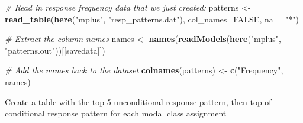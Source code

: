 \documentclass[
]{book}
\newenvironment{Shaded}{\begin{snugshade}}{\end{snugshade}}
\newcommand{\AttributeTok}[1]{\textcolor[rgb]{0.13,0.29,0.53}{#1}}
\newcommand{\CommentTok}[1]{\textcolor[rgb]{0.56,0.35,0.01}{\textit{#1}}}
\newcommand{\ConstantTok}[1]{\textcolor[rgb]{0.56,0.35,0.01}{#1}}
\newcommand{\FunctionTok}[1]{\textcolor[rgb]{0.13,0.29,0.53}{\textbf{#1}}}
\newcommand{\NormalTok}[1]{#1}
\newcommand{\OtherTok}[1]{\textcolor[rgb]{0.56,0.35,0.01}{#1}}
\newcommand{\StringTok}[1]{\textcolor[rgb]{0.31,0.60,0.02}{#1}}
\begin{document}
\begin{Shaded}
\begin{Highlighting}[]
\CommentTok{\# Read in response frequency data that we just created:}
\NormalTok{patterns }\OtherTok{\textless{}{-}} \FunctionTok{read\_table}\NormalTok{(}\FunctionTok{here}\NormalTok{(}\StringTok{"mplus"}\NormalTok{, }\StringTok{"resp\_patterns.dat"}\NormalTok{),}
                        \AttributeTok{col\_names=}\ConstantTok{FALSE}\NormalTok{, }\AttributeTok{na =} \StringTok{"*"}\NormalTok{) }

\CommentTok{\# Extract the column names}
\NormalTok{names }\OtherTok{\textless{}{-}} \FunctionTok{names}\NormalTok{(}\FunctionTok{readModels}\NormalTok{(}\FunctionTok{here}\NormalTok{(}\StringTok{"mplus"}\NormalTok{, }\StringTok{"patterns.out"}\NormalTok{))[[}\StringTok{\textquotesingle{}savedata\textquotesingle{}}\NormalTok{]]) }

\CommentTok{\# Add the names back to the dataset}
\FunctionTok{colnames}\NormalTok{(patterns) }\OtherTok{\textless{}{-}} \FunctionTok{c}\NormalTok{(}\StringTok{"Frequency"}\NormalTok{, names)  }
\end{Highlighting}
\end{Shaded}

Create a table with the top 5 unconditional response pattern, then top of conditional response pattern for each modal class assignment
\end{document}
